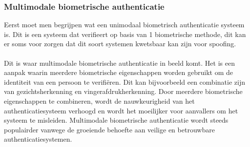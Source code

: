   \subsubsection{Multimodale biometrische authenticatie}%
  \label{subsubsec:multimodale-biometrische-authenticatie}
  Eerst moet men begrijpen wat een unimodaal biometrisch authenticatie systeem is. Dit is een systeem dat verifieert op basis van 1 biometrische methode, dit kan er soms voor zorgen dat dit soort systemen kwetsbaar kan zijn voor spoofing.
  \\
  \\
  Dit is waar multimodale biometrische authenticatie in beeld komt. Het is een aanpak waarin meerdere biometrische eigenschappen worden gebruikt om de identiteit van een persoon te verifiëren. Dit kan bijvoorbeeld een combinatie zijn van gezichtsherkenning en vingerafdrukherkenning. Door meerdere biometrische eigenschappen te combineren, wordt de nauwkeurigheid van het authenticatiesysteem verhoogd en wordt het moeilijker voor aanvallers om het systeem te misleiden. Multimodale biometrische authenticatie wordt steeds populairder vanwege de groeiende behoefte aan veilige en betrouwbare authenticatiesystemen.
  
